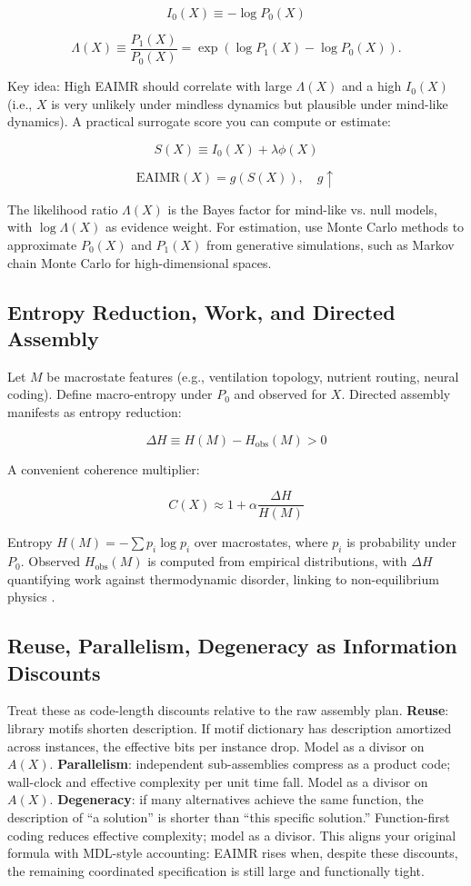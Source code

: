 \documentclass{article}
\begin{document}
\[ I_0(X) \equiv -\log P_0(X) \]

\[ \Lambda(X) \equiv \frac{P_1(X)}{P_0(X)} = \exp \left( \log P_1(X) - \log P_0(X) \right). \]

Key idea: High EAIMR should correlate with large $\Lambda(X)$ and a high $I_0(X)$ (i.e., $X$ is very unlikely under mindless dynamics but plausible under mind-like dynamics). A practical surrogate score you can compute or estimate:

\[ S(X) \equiv I_0(X) + \lambda \phi(X) \]

\[ \mathrm{EAIMR}(X) = g \left( S(X) \right), \quad g \uparrow \]

The likelihood ratio $\Lambda(X)$ is the Bayes factor for mind-like vs. null models, with $\log \Lambda(X)$ as evidence weight. For estimation, use Monte Carlo methods to approximate $P_0(X)$ and $P_1(X)$ from generative simulations, such as Markov chain Monte Carlo for high-dimensional spaces.

\subsection{Entropy Reduction, Work, and Directed Assembly}
Let $M$ be macrostate features (e.g., ventilation topology, nutrient routing, neural coding). Define macro-entropy under $P_0$ and observed for $X$. Directed assembly manifests as entropy reduction:

\[ \Delta H \equiv H(M) - H_{\mathrm{obs}}(M) > 0 \]

A convenient coherence multiplier:

\[ C(X) \approx 1 + \alpha \frac{\Delta H}{H(M)} \]

Entropy $H(M) = -\sum p_i \log p_i$ over macrostates, where $p_i$ is probability under $P_0$. Observed $H_{\mathrm{obs}}(M)$ is computed from empirical distributions, with $\Delta H$ quantifying work against thermodynamic disorder, linking to non-equilibrium physics \citep{friston2010}.

\subsection{Reuse, Parallelism, Degeneracy as Information Discounts}
Treat these as code-length discounts relative to the raw assembly plan. \textbf{Reuse}: library motifs shorten description. If motif dictionary has description amortized across instances, the effective bits per instance drop. Model as a divisor on $A(X)$. \textbf{Parallelism}: independent sub-assemblies compress as a product code; wall-clock and effective complexity per unit time fall. Model as a divisor on $A(X)$. \textbf{Degeneracy}: if many alternatives achieve the same function, the description of ``a solution'' is shorter than ``this specific solution.'' Function-first coding reduces effective complexity; model as a divisor. This aligns your original formula with MDL-style accounting: EAIMR rises when, despite these discounts, the remaining coordinated specification is still large and functionally tight.
\end{document}
